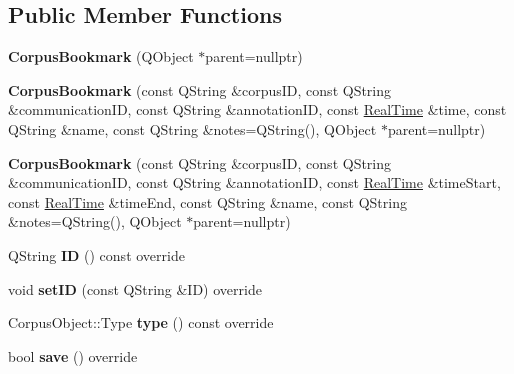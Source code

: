 \subsection*{Public Member Functions}
\begin{DoxyCompactItemize}
\item 
\mbox{\label{class_corpus_bookmark_a122599342d6bb2f6b6beae0d7a8ffece}} 
{\bfseries Corpus\+Bookmark} (Q\+Object $\ast$parent=nullptr)
\item 
\mbox{\label{class_corpus_bookmark_afe16569951bdaeefd4aa0e1ca0da54c4}} 
{\bfseries Corpus\+Bookmark} (const Q\+String \&corpus\+ID, const Q\+String \&communication\+ID, const Q\+String \&annotation\+ID, const \hyperlink{struct_real_time}{Real\+Time} \&time, const Q\+String \&name, const Q\+String \&notes=Q\+String(), Q\+Object $\ast$parent=nullptr)
\item 
\mbox{\label{class_corpus_bookmark_af8bb4f7d5570f674626644a8e90d4384}} 
{\bfseries Corpus\+Bookmark} (const Q\+String \&corpus\+ID, const Q\+String \&communication\+ID, const Q\+String \&annotation\+ID, const \hyperlink{struct_real_time}{Real\+Time} \&time\+Start, const \hyperlink{struct_real_time}{Real\+Time} \&time\+End, const Q\+String \&name, const Q\+String \&notes=Q\+String(), Q\+Object $\ast$parent=nullptr)
\item 
\mbox{\label{class_corpus_bookmark_a10899c6bdab48f5b6b1237cd61b4a726}} 
Q\+String {\bfseries ID} () const override
\item 
\mbox{\label{class_corpus_bookmark_aed714ed4ef3f9a94eb408e4bc025dc37}} 
void {\bfseries set\+ID} (const Q\+String \&ID) override
\item 
\mbox{\label{class_corpus_bookmark_ababfd655298586a3d621a882ee416f99}} 
Corpus\+Object\+::\+Type {\bfseries type} () const override
\item 
\mbox{\label{class_corpus_bookmark_addc15dc499b80a28492005f9d6f5247e}} 
bool {\bfseries save} () override
\item 
\mbox{\label{class_corpus_bookmark_ac4d85da7d148a605745d688698d38e2d}} 

\end{DoxyCompactItemize}
